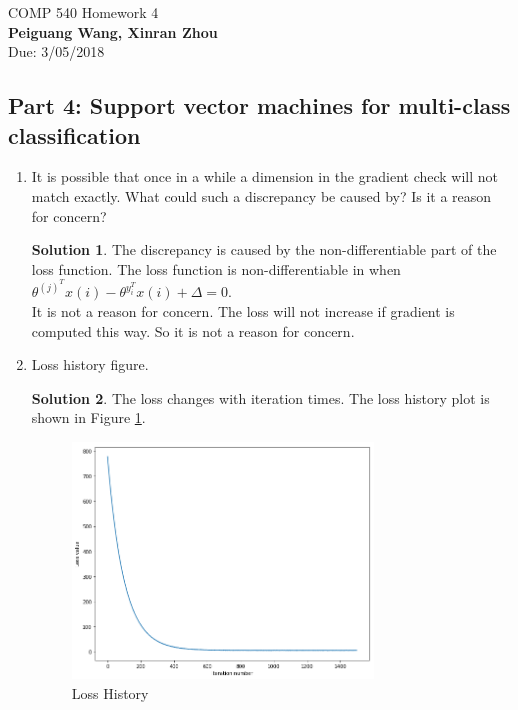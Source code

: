 \documentclass[]{book}
\theoremstyle{definition}
\newtheorem*{soln}{Solution}
\begin{document}
\begin{center}
{\Large COMP 540 \hspace{0.5cm} Homework 4}\\
\textbf{Peiguang Wang, Xinran Zhou}\\ %
Due: 3/05/2018 %
\end{center}

\vspace{0.2 cm}


\subsection*{Part 4: Support vector machines for multi-class classification }

\begin{enumerate}
	\item It is possible that once in a while a dimension in the gradient check will not match exactly. What could such a discrepancy be caused by? Is it a reason for concern?
	\begin{soln}
		The discrepancy is caused by the non-differentiable part of the loss function. The loss function is non-differentiable in when $\theta^{(j)^{T}}x(i) - \theta^{y_i^{T}}x(i)+\Delta = 0$. \\
		It is not a reason for concern. The loss will not increase if gradient is computed this way. So it is not a reason for concern.  
	\end{soln}

    \item Loss history figure.
    \begin{soln}
    	The loss changes with iteration times. The loss history plot is shown in Figure \ref{fig:lossHistory}.
    	\begin{figure}[H]
    		\centering
    		\includegraphics[width=8cm]{lossHistory.png}
    		\caption{Loss History}
    		\label{fig:lossHistory}
    	\end{figure}
    \end{soln}
    


\end{enumerate}
\end{document}
